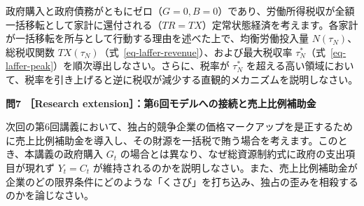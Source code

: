 \documentclass[
  japanese,
  lualatex,
  ja=standard,
  12pt,
  a4paper]{ltjsarticle}
\begin{document}
政府購入と政府債務がともにゼロ（\(G = 0, B = 0\)）であり、労働所得税収が全額一括移転として家計に還付される（\(TR = TX\)）定常状態経済を考えます。各家計が一括移転を所与として行動する理由を述べた上で、均衡労働投入量
\(N(\tau_N)\)、総税収関数
\(TX(\tau_N)\)（式~\ref{eq-laffer-revenue}）、および最大税収率
\(\tau_N^*\)（式~\ref{eq-laffer-peak}）を順次導出しなさい。さらに、税率が
\(\tau_N^*\)
を超える高い領域において、税率を引き上げると逆に税収が減少する直観的メカニズムを説明しなさい。


\textbf{問7 ［Research extension］：第6回モデルへの接続と売上比例補助金}

次回の第6回講義において、独占的競争企業の価格マークアップを是正するために売上比例補助金を導入し、その財源を一括税で賄う場合を考えます。このとき、本講義の政府購入
\(G_t\) の場合とは異なり、なぜ総資源制約式に政府の支出項目が現れず
\(Y_t = C_t\)
が維持されるのかを説明しなさい。また、売上比例補助金が企業のどの限界条件にどのような「くさび」を打ち込み、独占の歪みを相殺するのかを論じなさい。
\end{document}
